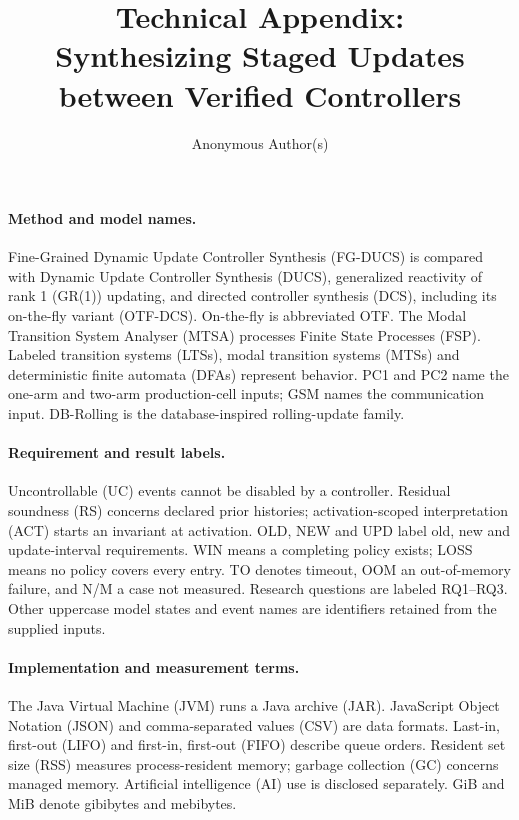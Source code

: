 \documentclass[11pt]{article}
\begin{document}
\title{Technical Appendix:\\Synthesizing Staged Updates\\between Verified Controllers}
\author{Anonymous Author(s)}
\date{}
\maketitle
\paragraph{Method and model names.}
Fine-Grained Dynamic Update Controller Synthesis (FG-DUCS) is compared with Dynamic Update Controller Synthesis (DUCS), generalized reactivity of rank 1 (GR(1)) updating, and directed controller synthesis (DCS), including its on-the-fly variant (OTF-DCS). On-the-fly is abbreviated OTF. The Modal Transition System Analyser (MTSA) processes Finite State Processes (FSP). Labeled transition systems (LTSs), modal transition systems (MTSs) and deterministic finite automata (DFAs) represent behavior. PC1 and PC2 name the one-arm and two-arm production-cell inputs; GSM names the communication input. DB-Rolling is the database-inspired rolling-update family.

\paragraph{Requirement and result labels.}
Uncontrollable (UC) events cannot be disabled by a controller. Residual soundness (RS) concerns declared prior histories; activation-scoped interpretation (ACT) starts an invariant at activation. OLD, NEW and UPD label old, new and update-interval requirements. WIN means a completing policy exists; LOSS means no policy covers every entry. TO denotes timeout, OOM an out-of-memory failure, and N/M a case not measured. Research questions are labeled RQ1--RQ3. Other uppercase model states and event names are identifiers retained from the supplied inputs.

\paragraph{Implementation and measurement terms.}
The Java Virtual Machine (JVM) runs a Java archive (JAR). JavaScript Object Notation (JSON) and comma-separated values (CSV) are data formats. Last-in, first-out (LIFO) and first-in, first-out (FIFO) describe queue orders. Resident set size (RSS) measures process-resident memory; garbage collection (GC) concerns managed memory. Artificial intelligence (AI) use is disclosed separately. GiB and MiB denote gibibytes and mebibytes.
\end{document}
